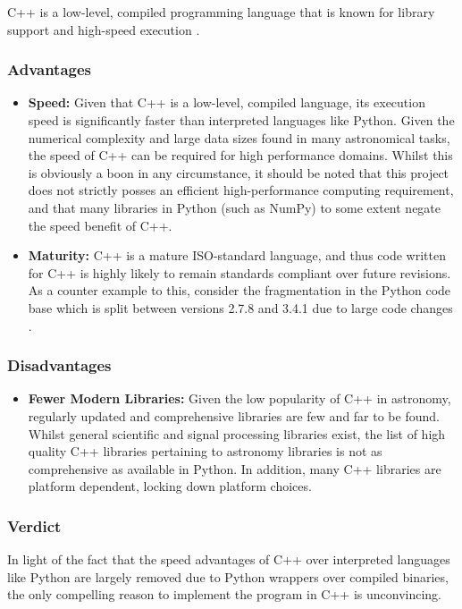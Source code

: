 \documentclass[titlesmallcaps, examinerscopy, copyrightpage]{uqthesis}
\begin{document}
C++ is a low-level, compiled programming language that is known for library support and high-speed execution \cite{cpp}.

\subsubsection{Advantages}
\begin{itemize}

\item \textbf{Speed:} Given that C++ is a low-level, compiled language, its execution speed is significantly faster than interpreted languages like Python. Given the numerical complexity and large data sizes found in many astronomical tasks, the speed of C++ can be required for high performance domains. Whilst this is obviously a boon in any circumstance, it should be noted that this project does not strictly posses an efficient high-performance computing requirement, and that many libraries in Python (such as NumPy) to some extent negate the speed benefit of C++.

\item \textbf{Maturity:} C++ is a mature ISO-standard language, and thus code written for C++ is highly likely to remain standards compliant over future revisions. As a counter example to this, consider the fragmentation in the Python code base which is split between versions 2.7.8 and 3.4.1 due to large code changes \cite{pythonDownload}.
\end{itemize}

\subsubsection{Disadvantages}
\begin{itemize}

\item \textbf{Fewer Modern Libraries:} Given the low popularity of C++ in astronomy, regularly updated and comprehensive libraries are few and far to be found. Whilst general scientific and signal processing libraries exist, the list of high quality C++ libraries pertaining to astronomy libraries is not as comprehensive as available in Python. In addition, many C++ libraries are platform dependent, locking down platform choices.

\end{itemize}

\subsubsection{Verdict}
In light of the fact that the speed advantages of C++ over interpreted languages like Python are largely removed due to Python wrappers over compiled binaries, the only compelling reason to implement the program in C++ is unconvincing.
\end{document}

